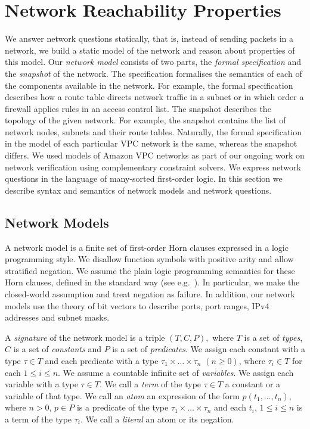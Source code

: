 \section{Network Reachability Properties}
\label{sect:aws/specification}
We answer network questions statically, that is, instead of sending packets in a network, we build a static model of the network and reason about properties of this model. Our \emph{network model} consists of two parts, the \emph{formal specification} and the \emph{snapshot} of the network. The specification formalises the semantics of each of the components available in the network. For example, the formal specification describes how a route table directs network traffic in a subnet or in which order a firewall applies rules in an access control list. The snapshot describes the topology of the given network. For example, the snapshot contains the list of network nodes, subnets and their route tables. Naturally, the formal specification in the model of each particular VPC network is the same, whereas the snapshot differs. We used models of Amazon VPC networks as part of our ongoing work on network verification using complementary constraint solvers. We express network questions in the language of many-sorted first-order logic. In this section we describe syntax and semantics of network models and network questions.

\subsection{Network Models}
\label{sect:aws/reachability/spec}
A network model is a finite set of first-order Horn clauses expressed in a logic programming style. We disallow function symbols with positive arity and allow stratified negation. We assume the plain logic programming semantics for these Horn clauses, defined in the standard way (see e.g.~\cite{DBLP:books/sp/Lloyd87}). In particular, we make the closed-world assumption and treat negation as failure. In addition, our network models use the theory of bit vectors to describe ports, port ranges, IPv4 addresses and subnet masks.

A \emph{signature} of the network model is a triple $(T, C, P),$ where $T$ is a set of \emph{types}, $C$ is a set of \emph{constants} and $P$ is a set of \emph{predicates}. We assign each constant with a type $\tau\in T$ and each predicate with a type $\tau_1\times\ldots\times\tau_n$ $(n\ge0)$, where $\tau_i\in T$ for each $1\leq i \leq n$. We assume a countable infinite set of \emph{variables}. We assign each variable with a type $\tau\in T$. We call a \emph{term} of the type $\tau\in T$ a constant or a variable of that type. We call an \emph{atom} an expression of the form $p(t_1,\ldots,t_n)$, where $n>0$, $p\in P$ is a predicate of the type $\tau_1\times\ldots\times\tau_n$ and each $t_i$, $1\leq i \leq n$ is a term of the type $\tau_i$. We call a \emph{literal} an atom or its negation.

